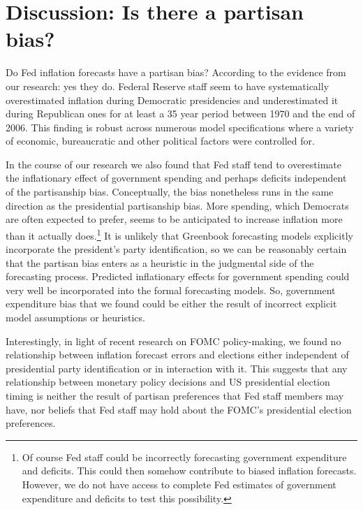 \documentclass[a4paper]{article}\usepackage{graphicx, color}
\begin{document}
\section*{Discussion: Is there a partisan bias?}

Do Fed inflation forecasts have a partisan bias? According to the evidence from our research: yes they do. Federal Reserve staff seem to have systematically overestimated inflation during Democratic presidencies and underestimated it during Republican ones for at least a 35 year period between 1970 and the end of 2006. This finding is robust across numerous model specifications where a variety of economic, bureaucratic and other political factors were controlled for. 

In the course of our research we also found that Fed staff tend to overestimate the inflationary effect of government spending and perhaps deficits independent of the partisanship bias. Conceptually, the bias nonetheless runs in the same direction as the presidential partisanship bias. More spending, which Democrats are often expected to prefer, seems to be anticipated to increase inflation more than it actually does.\footnote{Of course Fed staff could be incorrectly forecasting government expenditure and deficits. This could then somehow contribute to biased inflation forecasts. However, we do not have access to complete Fed estimates of government expenditure and deficits to test this possibility.} It is unlikely that Greenbook forecasting models explicitly incorporate the president's party identification, so we can be reasonably certain that the partisan bias enters as a heuristic in the judgmental side of the forecasting process. Predicted inflationary effects for government spending could very well be incorporated into the formal forecasting models. So, government expenditure bias that we found could be either the result of incorrect explicit model assumptions or heuristics.

Interestingly, in light of recent research on FOMC policy-making, we found no relationship between inflation forecast errors and elections either independent of presidential party identification or in interaction with it. This suggests that any relationship between monetary policy decisions and US presidential election timing is neither the result of partisan preferences that Fed staff members may have, nor beliefs that Fed staff may hold about the FOMC's presidential election preferences. 
\end{document}
